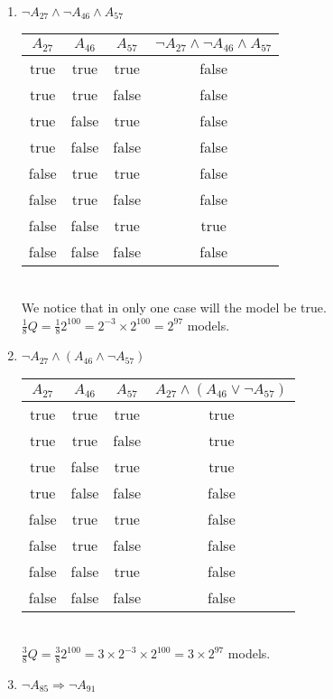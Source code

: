 \documentclass[paper=a4, fontsize=11pt]{scrartcl} %
\numberwithin{equation}{section} %
\numberwithin{figure}{section} %
\numberwithin{table}{section} %
\begin{document}
\begin{enumerate}
\begin{enumerate}
		\item %
		$\neg A_{27} \wedge \neg A_{46} \wedge A_{57}$

		\begin{tabular}{c c c c}
			\hline
			$A_{27}$ & $A_{46}$ & $ A_{57}$ & $\neg A_{27} \wedge \neg A_{46} \wedge A_{57}$ \\
			\hline
			true 	& true 		&true	&false\\
			true 	& true 		&false	&false\\
			true 	& false  	&true	&false\\
			true 	& false 	&false	&false\\
			false 	& true 		&true	&false\\
			false 	& true 		&false	&false\\
			false 	& false  	&true	&true\\
			false 	& false 	&false	&false\\
		\end{tabular}
		\\
		
		We notice that in only one case will the model be true. $\frac{1}{8}Q = \frac{1}{8}2^{100} = 2^{-3} \times 2^{100} = 2^{97}$ models.
		
		\item %
		$\neg A_{27} \wedge ( A_{46} \wedge \neg A_{57})$

		\begin{tabular}{c c c c}
			\hline
			$A_{27}$ & $A_{46}$ & $ A_{57}$ & $A_{27} \wedge (A_{46} \vee \neg A_{57})$ \\
			\hline
			true 	& true 		&true	&true\\
			true 	& true 		&false	&true\\
			true 	& false  	&true	&true\\
			true 	& false 	&false	&false\\
			false 	& true 		&true	&false\\
			false 	& true 		&false	&false\\
			false 	& false  	&true	&false\\
			false 	& false 	&false	&false\\
		\end{tabular}
		\\

		$\frac{3}{8}Q = \frac{3}{8}2^{100} = 3 \times 2^{-3} \times 2^{100} = 3 \times 2^{97}$ models. \\
		
		\item %
		$\neg A_{85} \Rightarrow \neg A_{91}$


\end{enumerate}
\end{enumerate}
\end{document}
